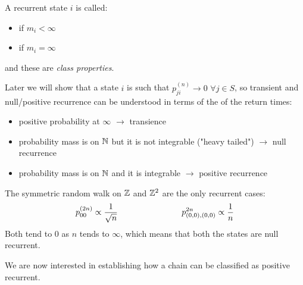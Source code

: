 \documentclass{article}
\begin{document}
	\begin{definition}
		A recurrent state $i$ is called:
		\begin{itemize}
			\item {} if $m_i<\infty$
			\item {} if $m_i=\infty$
		\end{itemize}
		and these are \textit{class properties}.
	\end{definition}
	Later we will show that a  state $i$ is such that $p_{ji}^{(n)}\rightarrow 0$ $\forall j\in S$, so transient and null/positive recurrence can be understood in terms of the  of the return times:
	\begin{itemize}[-]
		\item positive probability at $\infty$ $\rightarrow$ transience
		\item probability mass is on $\mathbb{N}$ but it is not integrable ("heavy tailed") $\rightarrow$ null recurrence
		\item probability mass is on $\mathbb{N}$ and it is integrable $\rightarrow$ positive recurrence
	\end{itemize}
	\begin{example}
		The symmetric random walk on $\mathbb{Z}$ and $\mathbb{Z}^2$ are the only recurrent cases:
		\[p_{00}^{(2n)}\propto\frac{1}{\sqrt{n}} \hspace{2.7cm} p_{(0,0),(0,0)}^{2n}\propto\frac{1}{n} \]
		Both tend to 0 as $n$ tends to $\infty$, which means that both the states are null recurrent.
	\end{example}
	We are now interested in establishing how a chain can be classified as positive recurrent.
	
\end{document}
